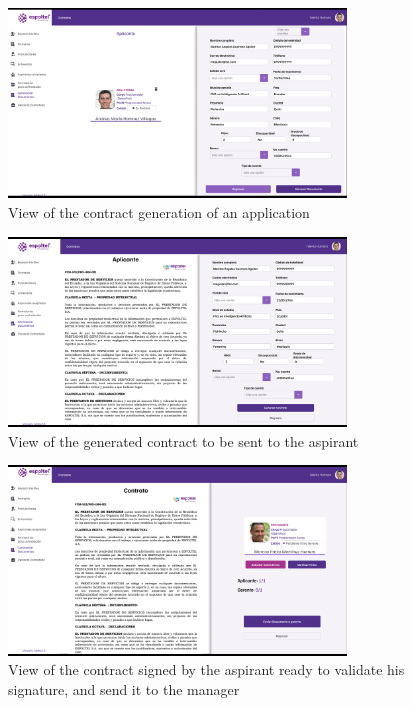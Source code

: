 \documentclass{scrreprt}
\begin{document}
\begin{figure}[H]
	\centering \small
	\includegraphics[width=0.8\textwidth]{WebPrototype/wflow-39.jpeg}
	\caption{View of the contract generation of an application}
\end{figure}

\begin{figure}[H]
	\centering \small
	\includegraphics[width=0.8\textwidth]{WebPrototype/wflow-40.jpeg}
	\caption{View of the generated contract to be sent to the aspirant}
\end{figure}

\begin{figure}[H]
	\centering \small
	\includegraphics[width=0.8\textwidth]{WebPrototype/wflow-41.jpeg}
	\caption{View of the contract signed by the aspirant ready to validate his signature, and send it to the manager}
\end{figure}
\end{document}
